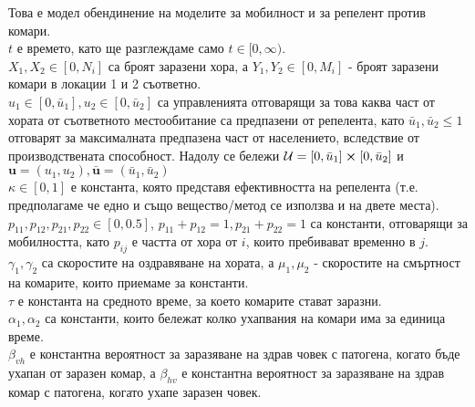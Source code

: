 Това е модел обендинение на моделите за мобилност и за репелент против комари. \\
$t$ е времето, като ще разглеждаме само $t \in [0, \infty)$. \\
$X_1, X_2 \in [0, N_i]$ са броят заразени хора, а $Y_1, Y_2 \in [0, M_i]$ - броят заразени комари в локации 1 и 2 съответно. \\
$u_1 \in [0, \bar{u}_1], u_2 \in [0, \bar{u}_2]$ са управленията отговарящи за това каква част от хората от съответното местообитание са предпазени от репелента, като $\bar{u}_1, \bar{u}_2 \leq 1 $ отговарят за максималната предпазена част от населението, вследствие от производствената способност. Надолу се бележи $\mathcal{U} = [0, \bar{u}_1] \cross [0, \bar{u}_2]$ и $\mathbf{u} = (u_1, u_2), \bar{\mathbf{u}} = (\bar{u}_1, \bar{u}_2)$ \\
$\kappa \in [0, 1]$ е константа, която представя ефективността на репелента (т.е. предполагаме че едно и също вещество/метод се използва и на двете места). \\
$p_{11}, p_{12}, p_{21}, p_{22} \in [0, 0.5]$, $p_{11} + p_{12} = 1, p_{21} + p_{22} = 1$ са константи, отговарящи за мобилността, като $p_{ij}$ е частта от хора от $i$, които пребивават временно в $j$. \\
$\gamma_1, \gamma_2$ са скоростите на оздравяване на хората, а $\mu_1, \mu_2$ - скоростите на смъртност на комарите, които приемаме за константи. \\
$\tau$ е константа на средното време, за което комарите стават заразни. \\
$\alpha_1, \alpha_2$ са константи, които бележат колко ухапвания на комари има за единица време. \\
$\beta_{vh}$ е константна вероятност за заразяване на здрав човек с патогена, когато бъде ухапан от заразен комар, а $\beta_{hv}$ е константна вероятност за заразяване на здрав комар с патогена, когато ухапе заразен човек.


